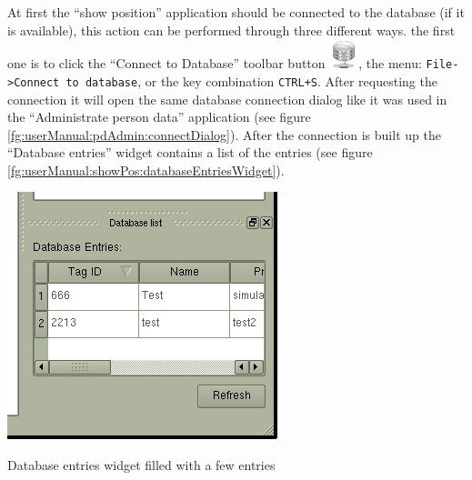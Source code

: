   At first the ``show position'' application should be connected to the database (if it is available), this action can be performed through three different ways. the first one is to click the ``Connect to Database'' toolbar button \includegraphics[scale=0.15]{images/UserManual/showPos/icons/db-connect.png}, the menu: \texttt{File->Connect to database}, or the key combination \texttt{CTRL+S}. After requesting the connection it will open the same database connection dialog like it was used in the ``Administrate person data'' application (see figure \ref{fg:userManual:pdAdmin:connectDialog}). After the connection is built up the ``Database entries'' widget contains a list of the entries (see figure \ref{fg:userManual:showPos:databaseEntriesWidget}).
  \begin{staticFigure}
   \begin{center}
     \includegraphics[scale=0.6]{images/UserManual/showPos/main-connected2DB.png}
     \caption{Database entries widget filled with a few entries}
     \label{fg:userManual:showPos:databaseEntriesWidget}
   \end{center}
  \end{staticFigure}


